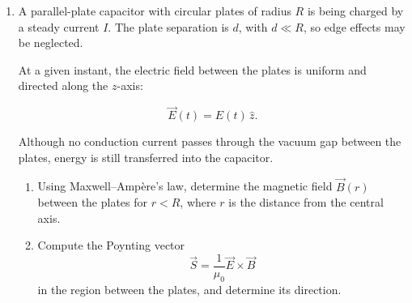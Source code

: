 \documentclass[12pt]{article}
\begin{document}
\begin{enumerate}
where $E_0$, $k$, and $\omega$ are positive constants.

\begin{enumerate}

\item Using Maxwell’s equations, determine the corresponding magnetic field $\vec{B}(z,t)$.

\item Compute the instantaneous Poynting vector

\[
\vec{S}=\frac{1}{\mu_0}\vec{E}\times\vec{B}
\]

and show explicitly that it points in the direction of propagation.

\item Find the time-averaged Poynting vector $\langle \vec{S} \rangle$.

\item Show that the instantaneous electromagnetic energy density

\[
u=\frac{1}{2}\varepsilon_0 E^2+\frac{1}{2\mu_0}B^2
\]

can be written entirely in terms of the electric field amplitude $E_0$, and prove that the electric and magnetic fields contribute equally to the total energy density.


\end{enumerate}

\item A parallel-plate capacitor with circular plates of radius $R$ is being charged by a steady current $I$. The plate separation is $d$, with $d \ll R$, so edge effects may be neglected.

At a given instant, the electric field between the plates is uniform and directed along the $z$-axis:

\[
\vec{E}(t)=E(t)\,\hat{z}.
\]

Although no conduction current passes through the vacuum gap between the plates, energy is still transferred into the capacitor.

\begin{enumerate}
    \item Using Maxwell–Ampère’s law, determine the magnetic field $\vec{B}(r)$ between the plates for $r<R$, where $r$ is the distance from the central axis.

    \item Compute the Poynting vector
    \[
    \vec{S}
    =
    \frac{1}{\mu_0}\vec{E}\times\vec{B}
    \]
    in the region between the plates, and determine its direction.


\end{enumerate}
\end{enumerate}
\end{document}
